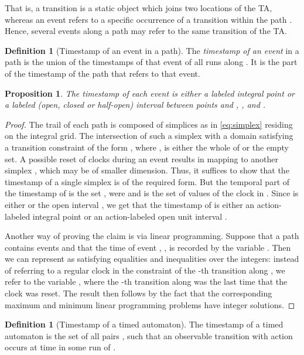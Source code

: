 \documentclass[11pt]{amsart}
\newtheorem{proposition}[theorem]{Proposition}
\theoremstyle{definition}
\newtheorem{definition}[theorem]{Definition}
\begin{document}
That is, a transition is a static object which joins two locations of the TA, whereas an event refers to a specific occurrence of a transition within the path .
Hence, several events along a path may refer to the same transition of the TA.
\begin{definition}[Timestamp of an event in a path]
	The \emph{timestamp of an event} in a path  is the union of the timestamps of that event of all runs along .
	It is the part of the timestamp of the path that refers to that event.
\end{definition}
\begin{proposition}
\label{pr:mult_ev_timestamp}
The timestamp of each event is either a labeled integral point or a labeled (open, closed or half-open) interval between points  and , ,  and .
\end{proposition}
\begin{proof} 
	The trail of each path is composed of simplices as in \eqref{eq:simplex} residing on the integral grid.
	The intersection of such a simplex  with a domain satisfying a transition constraint of the form , where ,  is either the whole of  or the empty set.
	A possible reset of clocks  during an event results in mapping  to another simplex , which may be of smaller dimension.
	Thus, it suffices to show that the timestamp of a single simplex  is of the required form.
	But the temporal part of the timestamp of  is the set , were  and  is the set of values of the clock  in .
	Since  is either  or the open interval , we get that the timestamp of  is either an action-labeled integral point  or an action-labeled open unit interval .

	Another way of proving the claim is via linear programming.
	Suppose that a path  contains  events and that the time of event , , is recorded by the variable . Then we can represent  as satisfying equalities and inequalities over the integers: instead of referring to a regular clock  in the constraint of the -th transition along , we refer to the variable , where the -th transition along  was the last time that the clock  was reset. The result then follows by the fact that the corresponding maximum and minimum linear programming problems have integer solutions.	
\end{proof}	
\begin{definition}[Timestamp of a timed automaton]
	The timestamp  of a timed automaton  is the set of all pairs , such that an observable transition with action  occurs at time  in some run of .
\end{definition}
\end{document}
